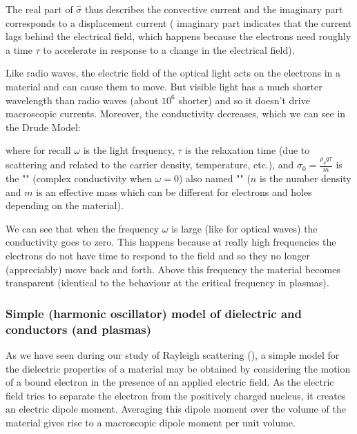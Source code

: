 	The real part of $\hat{\sigma}$ thus describes the convective current and the imaginary part corresponds to a displacement current ( imaginary part indicates that the current lags behind the electrical field, which happens because the electrons need roughly a time $\tau$ to accelerate in response to a change in the electrical field).
	
	Like radio waves, the electric field of the optical light acts on the electrons in a material and can cause them to move. But visible light has a much shorter wavelength than radio waves (about $10^6$ shorter) and so it doesn't drive macroscopic currents. Moreover, the conductivity decreases, which we can see in the Drude Model:
	
	where for recall $\omega$ is the light frequency, $\tau$ is the relaxation time (due to scattering and related to the carrier density, temperature, etc.), and $\sigma _{0}=\frac {\rho_q q\tau }{m}$ is the "" (complex conductivity when $\omega=0$) also named "" ($n$ is the number density and $m$ is an effective mass which can be different for electrons and holes depending on the material).

	We can see that when the frequency $\omega$ is large (like for optical waves) the conductivity goes to zero. This happens because at really high frequencies the electrons do not have time to respond to the field and so they no longer (appreciably) move back and forth. Above this frequency the material becomes transparent (identical to the behaviour at the critical frequency in plasmas).
	
	\pagebreak
	\subsubsection{Simple (harmonic oscillator) model of dielectric and conductors (and plasmas)}\label{simple model of dielectric and conductors}
	As we have seen during our study of Rayleigh scattering (), a simple model for the dielectric properties of a material may be obtained by considering the motion of a bound electron in the presence of an applied electric field. As the electric field tries to separate the electron from the positively charged nucleus, it creates an electric dipole moment. Averaging this dipole moment over the volume of the material gives rise to a macroscopic dipole moment per unit volume.
	
